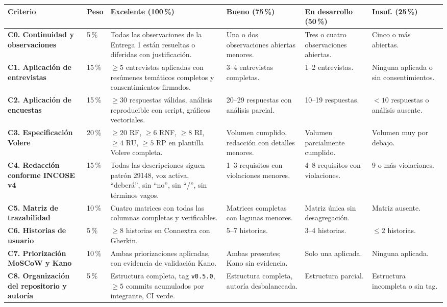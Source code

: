 \documentclass[11pt,a4paper]{article}
\begin{document}
\begin{longtable}{|L{4.2cm}|C{0.9cm}|L{3.3cm}|L{2.4cm}|L{2.4cm}|L{1.6cm}|}
\hline
{}
\textbf{Criterio} & \textbf{Peso} & \textbf{Excelente (100\,\%)} & \textbf{Bueno (75\,\%)} & \textbf{En desarrollo (50\,\%)} & \textbf{Insuf. (25\,\%)}\\ \hline
\endhead

\textbf{C0. Continuidad y observaciones} & 5\,\% & Todas las observaciones de la Entrega 1 est\'an resueltas o diferidas con justificaci\'on. & Una o dos observaciones abiertas menores. & Tres o cuatro observaciones abiertas. & Cinco o m\'as abiertas.\\ \hline
{}
\textbf{C1. Aplicaci\'on de entrevistas} & 15\,\% & $\geq 5$ entrevistas aplicadas con res\'umenes tem\'aticos completos y consentimientos firmados. & 3--4 entrevistas completas. & 1--2 entrevistas. & Ninguna aplicada o sin consentimientos.\\ \hline
\textbf{C2. Aplicaci\'on de encuestas} & 15\,\% & $\geq 30$ respuestas v\'alidas, an\'alisis reproducible con script, gr\'aficos vectoriales. & 20--29 respuestas con an\'alisis parcial. & 10--19 respuestas. & $< 10$ respuestas o an\'alisis ausente.\\ \hline
{}
\textbf{C3. Especificaci\'on Volere} & 20\,\% & $\geq 20$ RF, $\geq 6$ RNF, $\geq 8$ RI, $\geq 4$ RU, $\geq 5$ RP en plantilla Volere completa. & Volumen cumplido, redacci\'on con detalles menores. & Volumen parcialmente cumplido. & Volumen muy por debajo.\\ \hline
\textbf{C4. Redacci\'on conforme INCOSE v4} & 15\,\% & Todas las descripciones siguen patr\'on 29148, voz activa, ``deber\'a'', sin ``no'', sin ``/'', sin t\'erminos vagos. & 1--3 requisitos con violaciones menores. & 4--8 requisitos con violaciones. & 9 o m\'as violaciones.\\ \hline
{}
\textbf{C5. Matriz de trazabilidad} & 10\,\% & Cuatro matrices con todas las columnas completas y verificables. & Matrices completas con lagunas menores. & Matriz \'unica sin desagregaci\'on. & Matriz ausente.\\ \hline
\textbf{C6. Historias de usuario} & 5\,\% & $\geq 8$ historias en Connextra con Gherkin. & 5--7 historias. & 3--4 historias. & $\leq 2$ historias.\\ \hline
{}
\textbf{C7. Priorizaci\'on MoSCoW y Kano} & 10\,\% & Ambas priorizaciones aplicadas, con evidencia de validaci\'on Kano. & Ambas presentes; Kano sin evidencia. & Solo una aplicada. & Ninguna aplicada.\\ \hline
\textbf{C8. Organizaci\'on del repositorio y autor\'ia} & 5\,\% & Estructura completa, tag \texttt{v0.5.0}, $\geq 5$ commits acumulados por integrante, CI verde. & Estructura completa, autor\'ia desbalanceada. & Estructura parcial. & Estructura incompleta o sin tag.\\ \hline
\end{longtable}
\end{document}
